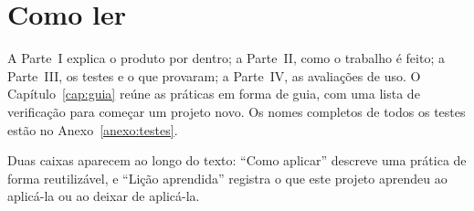 \section*{Como ler}

A Parte~I explica o produto por dentro; a Parte~II, como o trabalho é feito; a Parte~III, os testes e o que provaram; a Parte~IV, as avaliações de uso. O Capítulo~\ref{cap:guia} reúne as práticas em forma de guia, com uma lista de verificação para começar um projeto novo. Os nomes completos de todos os testes estão no Anexo~\ref{anexo:testes}.

Duas caixas aparecem ao longo do texto: \enquote{Como aplicar} descreve uma prática de forma reutilizável, e \enquote{Lição aprendida} registra o que este projeto aprendeu ao aplicá-la ou ao deixar de aplicá-la.
